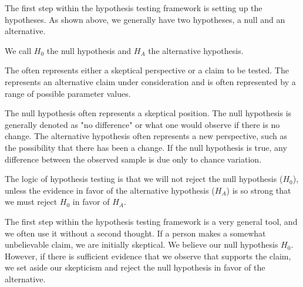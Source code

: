 The first step within the hypothesis testing framework is setting up the hypotheses. As shown above, we generally have two hypotheses, a null and an alternative. 

We call $H_0$ the null hypothesis and $H_A$ the alternative hypothesis.

\begin{termBox}{
{\small The  often represents either a skeptical perspective or a claim to be tested. The  represents an alternative claim under consideration and is often represented by a range of possible parameter values.}}
\end{termBox}

The null hypothesis often represents a skeptical position. The null hypothesis is generally denoted as "no difference" or what one would observe if there is no change.  The alternative hypothesis often represents a new perspective, such as the possibility that there has been a change. If the null hypothesis is true, any difference between the observed sample is due only to chance variation. 

\begin{tipBox}{
The logic of hypothesis testing is that we will not reject the null hypothesis ($H_0$), unless the evidence in favor of the alternative hypothesis ($H_A$) is so strong that we must reject $H_0$ in favor of $H_A$.}
\end{tipBox}

The first step within the hypothesis testing framework is a very general tool, and we often use it without a second thought. If a person makes a somewhat unbelievable claim, we are initially skeptical. We believe our null hypothesis $H_0$. However, if there is sufficient evidence that we observe that supports the claim, we set aside our skepticism and reject the null hypothesis in favor of the alternative. 

